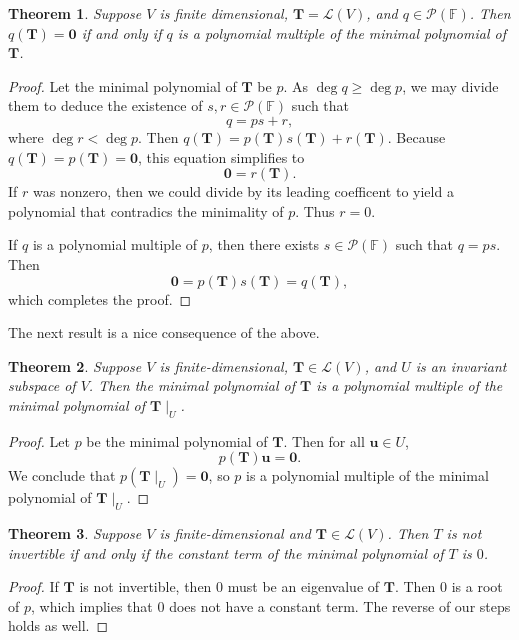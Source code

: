 \documentclass[11pt]{article}
\renewcommand{\vec}[1]{\mathbf{#1}}
\newcommand{\mat}[1]{\mathbf{#1}}
\newtheorem{theorem}{Theorem}
\begin{document}
\begin{theorem}
	Suppose $V$ is finite dimensional, $\mat{T} = \mathcal{L}(V)$, and $q \in \mathcal{P}(\mathbb{F})$. Then $q(\mat{T}) = \mat{0}$ if and only if $q$ is a polynomial multiple of the minimal polynomial of $\mat{T}$.
\end{theorem}
\begin{adjustwidth}{1cm}{}
	\begin{proof}
		Let the minimal polynomial of $\mat{T}$ be $p$. As $\deg q \ge \deg p$, we may divide them to deduce the existence of $s, r \in \mathcal{P}(\mathbb{F})$ such that
		\[
			q = ps + r,
		\]
		where $\deg r < \deg p$. Then $q(\mat{T}) = p(\mat{T})s(\mat{T}) + r(\mat{T})$. Because $q(\mat{T}) = p(\mat{T}) = \mat{0}$, this equation simplifies to
		\[
			\mat{0} = r(\mat{T}).
		\]
		If $r$ was nonzero, then we could divide by its leading coefficent to yield a polynomial that contradics the minimality of $p$. Thus $r = 0$.

		If $q$ is a polynomial multiple of $p$, then there exists $s \in \mathcal{P}(\mathbb{F})$ such that $q = ps$. Then
		\[
			\mat{0} = p(\mat{T})s(\mat{T}) = q(\mat{T}),
		\]
		which completes the proof.
	\end{proof}
\end{adjustwidth}

The next result is a nice consequence of the above.

\begin{theorem}
	Suppose $V$ is finite-dimensional, $\mat{T} \in \mathcal{L}(V)$, and $U$ is an invariant subspace of $V$. Then the minimal polynomial of $\mat{T}$ is a polynomial multiple of the minimal polynomial of $\mat{T} \mid_{U}$.
\end{theorem}
\begin{adjustwidth}{1cm}{}
	\begin{proof}
		Let $p$ be the minimal polynomial of $\mat{T}$. Then for all $\vec{u} \in U$, 
		\[
			p(\mat{T}) \vec{u} = \vec{0}.
		\]
		We conclude that $p(\mat{T} \mid_{U}) = \mat{0}$, so $p$ is a polynomial multiple of the minimal polynomial of $\mat{T} \mid_{U}$.
	\end{proof}
\end{adjustwidth}

\begin{theorem}
	Suppose $V$ is finite-dimensional and $\mat{T} \in \mathcal{L}(V)$. Then $T$ is not invertible if and only if the constant term of the minimal polynomial of $T$ is $0$.
\end{theorem}
\begin{adjustwidth}{1cm}{}
	\begin{proof}
		If $\mat{T}$ is not invertible, then $0$ must be an eigenvalue of $\mat{T}$. Then $0$ is a root of $p$, which implies that $0$ does not have a constant term. The reverse of our steps holds as well.
	\end{proof}
\end{adjustwidth}
\end{document}
